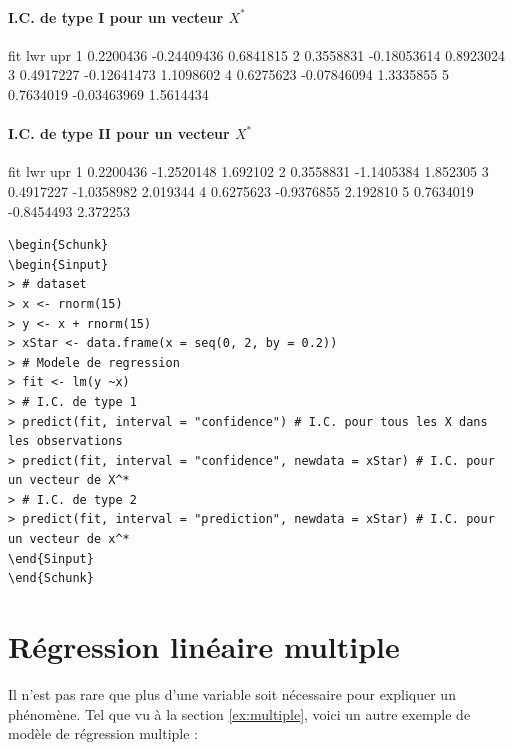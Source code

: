 \documentclass[11pt,french]{report}
\begin{document}
\subsubsection*{I.C. de type I pour un vecteur $X^*$}
\begin{Schunk}
\begin{Soutput}
        fit         lwr       upr
1 0.2200436 -0.24409436 0.6841815
2 0.3558831 -0.18053614 0.8923024
3 0.4917227 -0.12641473 1.1098602
4 0.6275623 -0.07846094 1.3335855
5 0.7634019 -0.03463969 1.5614434
\end{Soutput}
\end{Schunk}

\subsubsection*{I.C. de type II pour un vecteur $X^*$}
\begin{Schunk}
\begin{Soutput}
        fit        lwr      upr
1 0.2200436 -1.2520148 1.692102
2 0.3558831 -1.1405384 1.852305
3 0.4917227 -1.0358982 2.019344
4 0.6275623 -0.9376855 2.192810
5 0.7634019 -0.8454493 2.372253
\end{Soutput}
\end{Schunk}

\begin{lstlisting}[linerange=\\begin\{Sinput\}-\\end\{Sinput\},includerangemarker=false, caption = Code source en R pour l'exemple]
\begin{Schunk}
\begin{Sinput}
> # dataset
> x <- rnorm(15)
> y <- x + rnorm(15)
> xStar <- data.frame(x = seq(0, 2, by = 0.2)) 
> # Modele de regression
> fit <- lm(y ~x)
> # I.C. de type 1
> predict(fit, interval = "confidence") # I.C. pour tous les X dans les observations
> predict(fit, interval = "confidence", newdata = xStar) # I.C. pour un vecteur de X^*
> # I.C. de type 2
> predict(fit, interval = "prediction", newdata = xStar) # I.C. pour un vecteur de x^*
\end{Sinput}
\end{Schunk}
\end{lstlisting}
\bigskip

\chapter{Régression linéaire multiple}
Il n'est pas rare que plus d'une variable soit nécessaire pour expliquer un phénomène. 
Tel que vu à la section \ref{ex:multiple}, voici un autre exemple de modèle de régression multiple :
\end{document}
